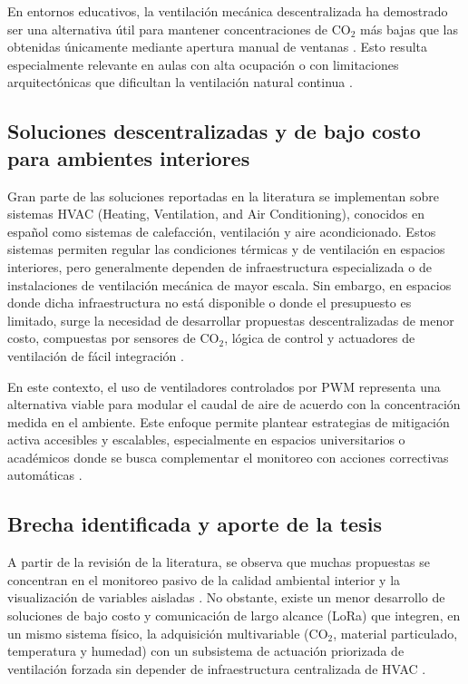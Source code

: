 En entornos educativos, la ventilación mecánica descentralizada ha demostrado ser una alternativa útil para mantener concentraciones de CO$_2$ más bajas que las obtenidas únicamente mediante apertura manual de ventanas \cite{bordin_2025}. Esto resulta especialmente relevante en aulas con alta ocupación o con limitaciones arquitectónicas que dificultan la ventilación natural continua \cite{bordin_2025}.

\subsection{Soluciones descentralizadas y de bajo costo para ambientes interiores}

Gran parte de las soluciones reportadas en la literatura se implementan sobre sistemas HVAC (Heating, Ventilation, and Air Conditioning), conocidos en español como sistemas de calefacción, ventilación y aire acondicionado. Estos sistemas permiten regular las condiciones térmicas y de ventilación en espacios interiores, pero generalmente dependen de infraestructura especializada o de instalaciones de ventilación mecánica de mayor escala. Sin embargo, en espacios donde dicha infraestructura no está disponible o donde el presupuesto es limitado, surge la necesidad de desarrollar propuestas descentralizadas de menor costo, compuestas por sensores de CO$_2$, lógica de control y actuadores de ventilación de fácil integración \cite{barros_2024,bordin_2025}.

En este contexto, el uso de ventiladores controlados por PWM representa una alternativa viable para modular el caudal de aire de acuerdo con la concentración medida en el ambiente. Este enfoque permite plantear estrategias de mitigación activa accesibles y escalables, especialmente en espacios universitarios o académicos donde se busca complementar el monitoreo con acciones correctivas automáticas \cite{barros_2024,bordin_2025}.

\subsection{Brecha identificada y aporte de la tesis}

A partir de la revisión de la literatura, se observa que muchas propuestas se concentran en el monitoreo pasivo de la calidad ambiental interior y la visualización de variables aisladas \cite{barros_2024}. No obstante, existe un menor desarrollo de soluciones de bajo costo y comunicación de largo alcance (LoRa) que integren, en un mismo sistema físico, la adquisición multivariable (CO\(_2\), material particulado, temperatura y humedad) con un subsistema de actuación priorizada de ventilación forzada sin depender de infraestructura centralizada de HVAC \cite{emmerich_persily_2001,bordin_2025}.

